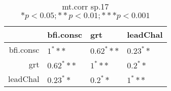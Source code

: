 \begin{table}[ht]
\centering
\begin{tabular}{rlll}
  \hline
 & bfi.consc & grt & leadChal \\ 
  \hline
bfi.consc & $1^***$ & $0.62^***$ & $0.23^**$ \\ 
  grt & $0.62^***$ & $1^***$ & $0.2^**$ \\ 
  leadChal & $0.23^**$ & $0.2^**$ & $1^***$ \\ 
   \hline
\end{tabular}
\caption{mt.corr sp.17 $* p < 0.05; ** p < 0.01; *** p < 0.001$} 
\end{table}
